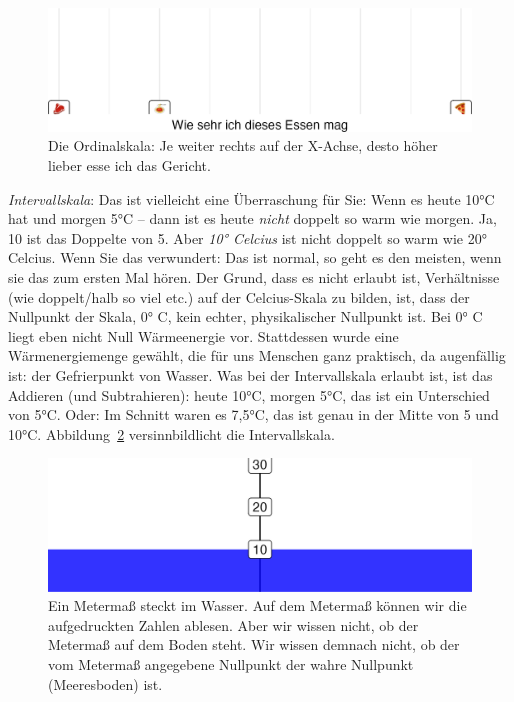 \documentclass[
  a4paper,
  DIV=11]{scrreprt}
\theoremstyle{definition}
\theoremstyle{definition}
\theoremstyle{remark}
\begin{document}
\begin{figure}

{\centering \includegraphics[width=1\textwidth,height=\textheight]{./fragenstellen_files/figure-pdf/fig-ordinal-1.png}

}

\caption{\label{fig-ordinal}Die Ordinalskala: Je weiter rechts auf der
X-Achse, desto höher lieber esse ich das Gericht.}

\end{figure}

\emph{Intervallskala}: Das ist vielleicht eine Überraschung für Sie:
Wenn es heute 10°C hat und morgen 5°C -- dann ist es heute \emph{nicht}
doppelt so warm wie morgen. Ja, 10 ist das Doppelte von 5. Aber
\emph{10° Celcius} ist nicht doppelt so warm wie 20° Celcius. Wenn Sie
das verwundert: Das ist normal, so geht es den meisten, wenn sie das zum
ersten Mal hören. Der Grund, dass es nicht erlaubt ist, Verhältnisse
(wie doppelt/halb so viel etc.) auf der Celcius-Skala zu bilden, ist,
dass der Nullpunkt der Skala, 0° C, kein echter, physikalischer
Nullpunkt ist. Bei 0° C liegt eben nicht Null Wärmeenergie vor.
Stattdessen wurde eine Wärmenergiemenge gewählt, die für uns Menschen
ganz praktisch, da augenfällig ist: der Gefrierpunkt von Wasser. Was bei
der Intervallskala erlaubt ist, ist das Addieren (und Subtrahieren):
heute 10°C, morgen 5°C, das ist ein Unterschied von 5°C. Oder: Im
Schnitt waren es 7,5°C, das ist genau in der Mitte von 5 und 10°C.
Abbildung~\ref{fig-intervall} versinnbildlicht die Intervallskala.

\begin{figure}

{\centering \includegraphics[width=1\textwidth,height=\textheight]{./fragenstellen_files/figure-pdf/fig-intervall-1.png}

}

\caption{\label{fig-intervall}Ein Metermaß steckt im Wasser. Auf dem
Metermaß können wir die aufgedruckten Zahlen ablesen. Aber wir wissen
nicht, ob der Metermaß auf dem Boden steht. Wir wissen demnach nicht, ob
der vom Metermaß angegebene Nullpunkt der wahre Nullpunkt (Meeresboden)
ist.}

\end{figure}
\end{document}

